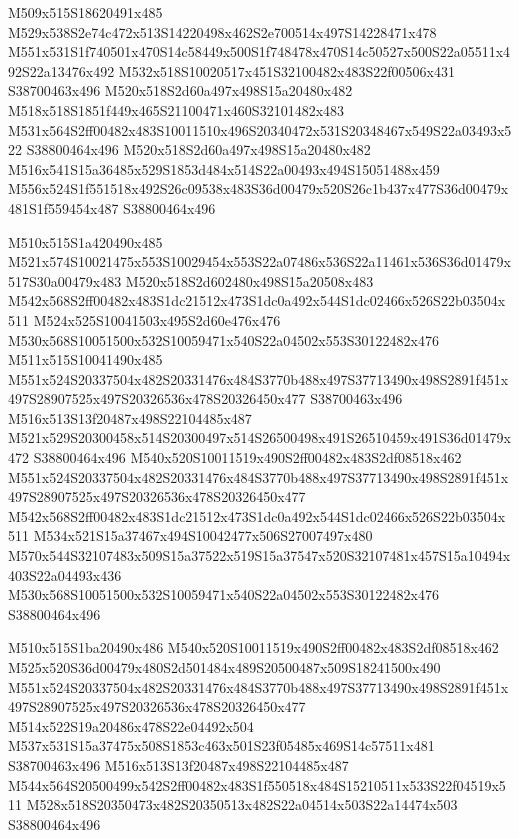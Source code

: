 \documentclass{article}
\begin{document}
\begin{multicols}{2}
M509x515S18620491x485 M529x538S2e74c472x513S14220498x462S2e700514x497S14228471x478 M551x531S1f740501x470S14c58449x500S1f748478x470S14c50527x500S22a05511x492S22a13476x492 M532x518S10020517x451S32100482x483S22f00506x431 S38700463x496 M520x518S2d60a497x498S15a20480x482 M518x518S1851f449x465S21100471x460S32101482x483 M531x564S2ff00482x483S10011510x496S20340472x531S20348467x549S22a03493x522 S38800464x496 M520x518S2d60a497x498S15a20480x482 M516x541S15a36485x529S1853d484x514S22a00493x494S15051488x459 M556x524S1f551518x492S26c09538x483S36d00479x520S26c1b437x477S36d00479x481S1f559454x487 S38800464x496

M510x515S1a420490x485 M521x574S10021475x553S10029454x553S22a07486x536S22a11461x536S36d01479x517S30a00479x483 M520x518S2d602480x498S15a20508x483 M542x568S2ff00482x483S1dc21512x473S1dc0a492x544S1dc02466x526S22b03504x511 M524x525S10041503x495S2d60e476x476 M530x568S10051500x532S10059471x540S22a04502x553S30122482x476 M511x515S10041490x485 M551x524S20337504x482S20331476x484S3770b488x497S37713490x498S2891f451x497S28907525x497S20326536x478S20326450x477 S38700463x496 M516x513S13f20487x498S22104485x487 M521x529S20300458x514S20300497x514S26500498x491S26510459x491S36d01479x472 S38800464x496 M540x520S10011519x490S2ff00482x483S2df08518x462 M551x524S20337504x482S20331476x484S3770b488x497S37713490x498S2891f451x497S28907525x497S20326536x478S20326450x477 M542x568S2ff00482x483S1dc21512x473S1dc0a492x544S1dc02466x526S22b03504x511 M534x521S15a37467x494S10042477x506S27007497x480 M570x544S32107483x509S15a37522x519S15a37547x520S32107481x457S15a10494x403S22a04493x436 M530x568S10051500x532S10059471x540S22a04502x553S30122482x476 S38800464x496

M510x515S1ba20490x486 M540x520S10011519x490S2ff00482x483S2df08518x462 M525x520S36d00479x480S2d501484x489S20500487x509S18241500x490 M551x524S20337504x482S20331476x484S3770b488x497S37713490x498S2891f451x497S28907525x497S20326536x478S20326450x477 M514x522S19a20486x478S22e04492x504 M537x531S15a37475x508S1853c463x501S23f05485x469S14c57511x481 S38700463x496 M516x513S13f20487x498S22104485x487 M544x564S20500499x542S2ff00482x483S1f550518x484S15210511x533S22f04519x511 M528x518S20350473x482S20350513x482S22a04514x503S22a14474x503 S38800464x496


\end{multicols}
\end{document}
